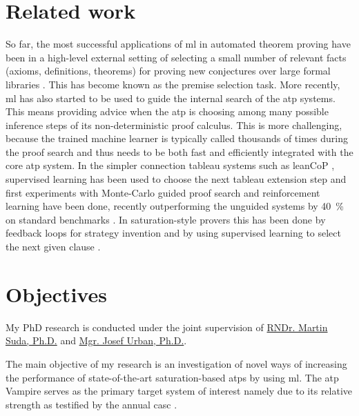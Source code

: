 \documentclass{article}
\begin{document}
\section{Related work}

So far, the most successful applications of \gls{ml} in automated theorem proving have been in a high-level external setting of selecting a small number of relevant facts (axioms, definitions, theorems) for proving new conjectures over large formal libraries \cite{DBLP:journals/jar/AlamaHKTU14,DBLP:journals/jar/BlanchetteGKKU16,DBLP:conf/cpp/GauthierK15}.
This has become known as the premise selection task.
More recently, \gls{ml} has also started to be used to guide the internal search of the \gls{atp} systems.
This means providing advice when the \gls{atp} is choosing among many possible inference steps of its non-deterministic proof calculus.
This is more challenging, because the trained machine learner is typically called thousands of times during the proof search and thus needs to be both fast and efficiently integrated with the core \gls{atp} system.
In the simpler connection tableau systems such as leanCoP \cite{10.1007/978-3-540-71070-7_23}, supervised learning has been used to choose the next tableau extension step \cite{DBLP:journals/jar/FarberKU21} and first experiments with Monte-Carlo guided proof search and reinforcement learning have been done, recently outperforming the unguided systems by \SI{40}{\percent} on standard benchmarks \cite{DBLP:conf/nips/KaliszykUMO18}.
In saturation-style provers this has been done by feedback loops for strategy invention \cite{DBLP:journals/aicom/JakubuvU18,DBLP:conf/gcai/SchaferS15} and by using supervised learning \cite{DBLP:conf/cade/JakubuvCOP0U20,DBLP:conf/lpar/LoosISK17} to select the next given clause \cite{McCune2003}.


\section{Objectives}

My PhD research is conducted under the joint supervision of
\href{http://people.ciirc.cvut.cz/~sudamar2/}{RNDr. Martin Suda, Ph.D.} and
\href{https://people.ciirc.cvut.cz/~urbanjo3/}{Mgr. Josef Urban, Ph.D.}.

The main objective of my research is an investigation of novel ways of increasing the performance of state-of-the-art saturation-based \glspl{atp} by using \gls{ml}.
The \gls{atp} Vampire \cite{DBLP:conf/cav/KovacsV13} serves as the primary target system of interest
namely due to its relative strength
as testified by the annual \gls{casc} \cite{Sut16}.
\end{document}
